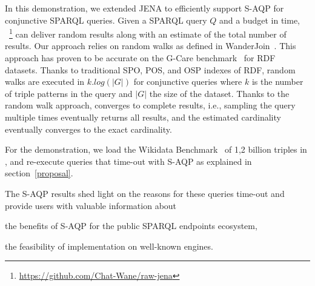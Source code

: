   In this demonstration, we extended JENA to efficiently support
  S-AQP for conjunctive 
  SPARQL queries. Given a SPARQL query $Q$ and a budget in time,
  \NAME~\footnote{\url{https://github.com/Chat-Wane/raw-jena}} can deliver random results along with an estimate of the
  total number of results. Our approach relies on random
 walks as defined in WanderJoin~\cite{li2019wanderjoin}. This approach
 has proven to be accurate on the G-Care
 benchmark~\cite{DBLP:conf/sigmod/ParkKBKHH20} for RDF datasets. Thanks
 to traditional SPO, POS, and OSP indexes of RDF, random
 walks are executed in $k.log(|G|)$ for conjunctive queries where
 $k$ is the number of triple patterns in the query and $|G|$ the size
 of the dataset. Thanks to the random walk approach, \NAME converges
 to complete results, i.e., sampling the query multiple times eventually
 returns all results, and the estimated cardinality eventually converges
 to the exact cardinality.

 \noindent For the demonstration, we load the Wikidata
 Benchmark~\cite{angles2022wdbench} of 1,2 billion triples in \NAME, and
 re-execute queries that time-out with S-AQP as explained in
 section~\ref{proposal}. 
 
 The S-AQP results shed light on the reasons for these queries time-out and provide users with valuable  information about
\begin{inparaenum}[(i)]
\item the benefits of S-AQP for the public SPARQL endpoints ecosystem,
\item the feasibility of implementation on well-known engines.
\end{inparaenum}



